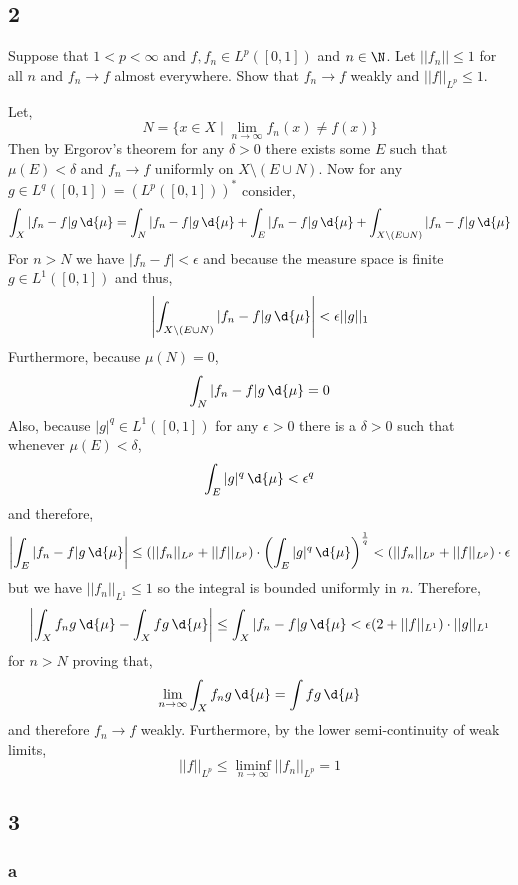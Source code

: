 \documentclass[12pt]{article}
\begin{document}
\subsection{2}

\begin{exercise}
Suppose that $1 < p < \infty$ and $f, f_n \in L^p([0,1])$ and $n \in \N$. Let $|| f_n || \le 1$ for all $n$ and $f_n \to f$ almost everywhere. Show that $f_n \to f$ weakly and $|| f ||_{L^p} \le 1$. 
\end{exercise}

Let,
\[ N = \{ x \in X \mid \lim_{n \to \infty} f_n(x) \neq f(x) \} \]
Then by Ergorov's theorem for any $\delta > 0$ there exists some $E$ such that $\mu(E) < \delta$ and $f_n \to f$ uniformly on $X \setminus (E \cup N)$. Now for any $g \in L^q([0,1]) = (L^p([0,1]))^*$ consider,
\[ \int_X |f_n - f| g \, \d{\mu} = \int_{N} |f_n - f| g \, \d{\mu} + \int_{E} |f_n - f| g \, \d{\mu} + \int_{X \setminus (E \cup N)} |f_n - f| g \, \d{\mu} \] 
For $n > N$ we have $|f_n - f| < \epsilon$ and because the measure space is finite $g \in L^1([0,1])$ and thus,
\[ \left| \int_{X \setminus (E \cup N)} |f_n - f| g \, \d{\mu} \right| < \epsilon || g ||_1 \]
Furthermore, because $\mu(N) = 0$,
\[ \int_{N} |f_n - f| g \, \d{\mu} = 0 \]
Also, because $|g|^q \in L^1([0,1])$ for any $\epsilon > 0$ there is a $\delta > 0$ such that whenever $\mu(E) < \delta$,
\[ \int_E |g|^q \, \d{\mu} < \epsilon^q \]
and therefore,
\[ \left| \int_{E} |f_n - f| g \, \d{\mu} \right| \le (|| f_n ||_{L^p} + || f ||_{L^p}) \cdot \left( \int_{E} |g|^q \, \d{\mu} \right)^{\frac{1}{q}} < (|| f_n ||_{L^p} + || f ||_{L^p}) \cdot \epsilon \]
but we have $|| f_n ||_{L^1} \le 1$ so the integral is bounded uniformly in $n$. Therefore,
\[ \left| \int_X f_n g \, \d{\mu} - \int_X f g \, \d{\mu} \right| \le \int_X |f_n - f| g \, \d{\mu} < \epsilon (2 + || f ||_{L^1}) \cdot || g ||_{L^1} \]
for $n > N$ proving that,
\[ \lim_{n \to \infty} \int_X f_n g \, \d{\mu} = \int fg \, \d{\mu} \]
and therefore $f_n \to f$ weakly. Furthermore, by the lower semi-continuity of weak limits,
\[ || f ||_{L^p} \le \liminf_{n \to \infty} || f_n ||_{L^p} = 1 \]

\subsection{3}

\subsubsection{a}
\end{document}
